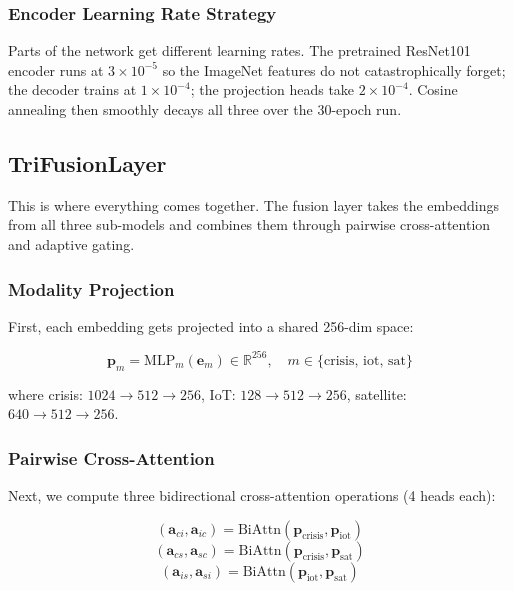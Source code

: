 \documentclass[journal]{IEEEtran}
\begin{document}
\subsubsection{Encoder Learning Rate Strategy}

Parts of the network get different learning rates. The pretrained ResNet101 encoder runs at $3 \times 10^{-5}$ so the ImageNet features do not catastrophically forget; the decoder trains at $1 \times 10^{-4}$; the projection heads take $2 \times 10^{-4}$. Cosine annealing then smoothly decays all three over the 30-epoch run.

\subsection{TriFusionLayer}

This is where everything comes together. The fusion layer takes the embeddings from all three sub-models and combines them through pairwise cross-attention and adaptive gating.

\subsubsection{Modality Projection}

First, each embedding gets projected into a shared 256-dim space:

\begin{equation}
\mathbf{p}_m = \text{MLP}_m(\mathbf{e}_m) \in \mathbb{R}^{256}, \quad m \in \{\text{crisis, iot, sat}\}
\end{equation}

where crisis: $1024 \to 512 \to 256$, IoT: $128 \to 512 \to 256$, satellite: $640 \to 512 \to 256$.

\subsubsection{Pairwise Cross-Attention}

Next, we compute three bidirectional cross-attention operations (4 heads each):

\begin{equation}
(\mathbf{a}_{ci}, \mathbf{a}_{ic}) = \text{BiAttn}(\mathbf{p}_\text{crisis}, \mathbf{p}_\text{iot})
\end{equation}
\begin{equation}
(\mathbf{a}_{cs}, \mathbf{a}_{sc}) = \text{BiAttn}(\mathbf{p}_\text{crisis}, \mathbf{p}_\text{sat})
\end{equation}
\begin{equation}
(\mathbf{a}_{is}, \mathbf{a}_{si}) = \text{BiAttn}(\mathbf{p}_\text{iot}, \mathbf{p}_\text{sat})
\end{equation}
\end{document}
